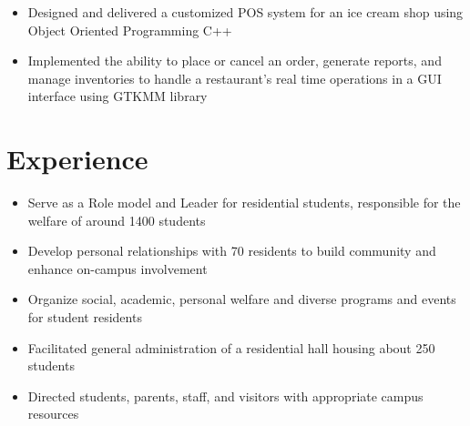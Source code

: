 \documentclass[]{deedy-resume-openfont}
\begin{document}
\begin{minipage}[t]{0.66\textwidth}
{ }
\sectionsep

 \hfill{}
 \large{\begin{itemize}[nolistsep, noitemsep]
            \item Designed and delivered a customized POS system for an ice cream shop using Object Oriented Programming C++
            \item Implemented the ability to place or cancel an order, generate reports, and manage inventories to handle a restaurant’s real time operations in a GUI interface using GTKMM library
        \end{itemize}
 
 }
\sectionsep








\section{\huge {\bf Experience}}


\hfill{}
\large {\begin{itemize}[nolistsep, noitemsep]
            \item Serve as a Role model and Leader for residential students, responsible for the welfare of around 1400 students
            \item Develop personal relationships with 70 residents to build community and enhance on-campus involvement
            \item Organize social, academic, personal welfare and diverse programs and events for student residents
        \end{itemize}
}
\sectionsep

\hfill{}
\large{\begin{itemize}[nolistsep, noitemsep]
            \item Facilitated general administration of a residential hall housing about 250 students
            \item Directed students, parents, staff, and visitors with appropriate campus resources
        \end{itemize}
}
\sectionsep



\end{minipage}
\end{document}
